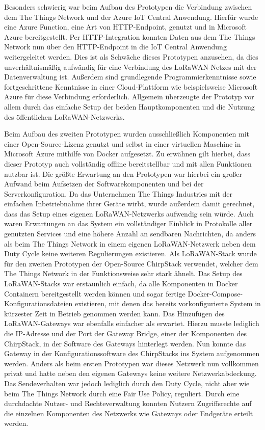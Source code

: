 Besonders schwierig war beim Aufbau des Prototypen die Verbindung zwischen dem The Things Network und der Azure IoT Central Anwendung. Hierfür wurde eine Azure Function, eine Art von HTTP-Endpoint, genutzt und in Microsoft Azure bereitgestellt. Per HTTP-Integration konnten Daten aus dem The Things Network nun über den HTTP-Endpoint in die IoT Central Anwendung weitergeleitet werden. Dies ist als Schwäche dieses Prototypen anzusehen, da dies unverhältnismäßig aufwändig für eine Verbindung des LoRaWAN-Netzes mit der Datenverwaltung ist. Außerdem sind grundlegende Programmierkenntnisse sowie fortgeschrittene Kenntnisse in einer Cloud-Plattform wie beispielsweise Microsoft Azure für diese Verbindung erforderlich. Allgemein überzeugte der Prototyp vor allem durch das einfache Setup der beiden Hauptkomponenten und die Nutzung des öffentlichen LoRaWAN-Netzwerks.

Beim Aufbau des zweiten Prototypen wurden ausschließlich Komponenten mit einer Open-Source-Lizenz genutzt und selbst in einer virtuellen Maschine in Microsoft Azure mithilfe von Docker aufgesetzt. Zu erwähnen gilt hierbei, dass dieser Prototyp auch vollständig offline bereitstellbar und mit allen Funktionen nutzbar ist. Die größte Erwartung an den Prototypen war hierbei ein großer Aufwand beim Aufsetzen der Softwarekomponenten und bei der Serverkonfiguration. Da das Unternehmen The Things Industries mit der einfachen Inbetriebnahme ihrer Geräte wirbt, wurde außerdem damit gerechnet, dass das Setup eines eigenen LoRaWAN-Netzwerks aufwendig sein würde. Auch waren Erwartungen an das System ein vollständiger Einblick in Protokolle aller genutzten Services und eine höhere Anzahl an sendbaren Nachrichten, da anders als beim The Things Network in einem eigenen LoRaWAN-Netzwerk neben dem Duty Cycle keine weiteren Regulierungen existieren.
Als LoRaWAN-Stack wurde für den zweiten Prototypen der Open-Source ChirpStack verwendet, welcher dem The Things Network in der Funktionsweise sehr stark ähnelt. Das Setup des LoRaWAN-Stacks war erstaunlich einfach, da alle Komponenten in Docker Containern bereitgestellt werden können und sogar fertige Docker-Compose-Konfigurationsdateien existieren, mit denen das bereits vorkonfigurierte System in kürzester Zeit in Betrieb genommen werden kann. Das Hinzufügen des LoRaWAN-Gateways war ebenfalls einfacher als erwartet. Hierzu musste lediglich die IP-Adresse und der Port der Gateway Bridge, einer der Komponenten des ChirpStack, in der Software des Gateways hinterlegt werden. Nun konnte das Gateway in der Konfigurationssoftware des ChirpStacks ins System aufgenommen werden. Anders als beim ersten Prototypen war dieses Netzwerk nun vollkommen privat und hatte neben den eigenen Gateways keine weitere Netzwerkabdeckung. Das Sendeverhalten war jedoch lediglich durch den Duty Cycle, nicht aber wie beim The Things Network durch eine Fair Use Policy, reguliert. Durch eine durchdachte Nutzer- und Rechteverwaltung konnten Nutzern Zugriffsrechte auf die einzelnen Komponenten des Netzwerks wie Gateways oder Endgeräte erteilt werden.

